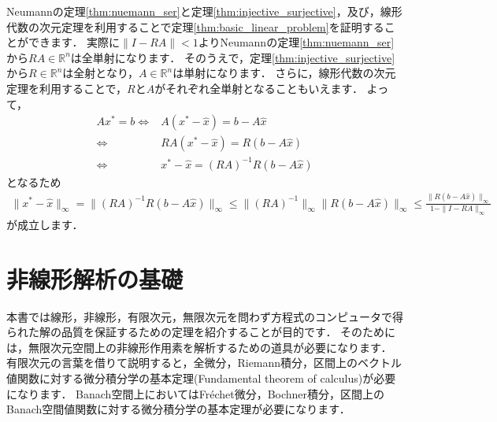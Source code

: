 Neumannの定理\ref{thm:nuemann_ser}と定理\ref{thm:injective_surjective}，及び，線形代数の次元定理を利用することで定理\ref{thm:basic_linear_problem}を証明することができます．
実際に$\| I - RA \| < 1$よりNeumannの定理\ref{thm:nuemann_ser}から$RA \in {\mathbb R}^n$は全単射になります．
そのうえで，定理\ref{thm:injective_surjective}から$R \in {\mathbb R}^n$は全射となり，$A \in {\mathbb R}^n$は単射になります．
さらに，線形代数の次元定理を利用することで，$R$と$A$がそれぞれ全単射となることもいえます．
よって，
\begin{align*}
	A x^* = b \Leftrightarrow& A (x^* - \hat{x}) = b - A \hat{x} \\
	 \Leftrightarrow& RA (x^* - \hat{x}) = R(b - A \hat{x}) \\
	 \Leftrightarrow& x^* - \hat{x}  = (RA)^{-1} R(b - A \hat{x})
\end{align*}
となるため
\begin{align*}
	\| x^* - \hat{x} \|_{\infty}  = \| (RA)^{-1} R(b - A \hat{x}) \|_{\infty} \le \| (RA)^{-1} \|_{\infty} \| R(b - A \hat{x}) \|_{\infty} \le \frac{ \| R(b - A \hat{x}) \|_{\infty} }{1 - \| I - RA \|_{\infty}} 
\end{align*}
が成立します．

%
\newpage
\section{非線形解析の基礎}\label{sec:nonlinear_analysis}
本書では線形，非線形，有限次元，無限次元を問わず方程式のコンピュータで得られた解の品質を保証するための定理を紹介することが目的です．
そのためには，無限次元空間上の非線形作用素を解析するための道具が必要になります．
有限次元の言葉を借りて説明すると，全微分，Riemann積分，区間上のベクトル値関数に対する微分積分学の基本定理(Fundamental theorem of calculus)が必要になります．
Banach空間上においてはFr\'echet微分，Bochner積分，区間上のBanach空間値関数に対する微分積分学の基本定理が必要になります．


